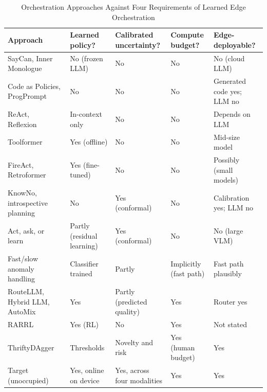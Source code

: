 \documentclass[journal]{IEEEtran}
\begin{document}
\begin{table}[!t]
\centering
\caption{Orchestration Approaches Against Four Requirements of Learned Edge Orchestration}\label{tab:orch}%
\footnotesize
\begin{tabular}{@{}>{\raggedright\arraybackslash}p{0.320\dimexpr\textwidth-10\tabcolsep\relax}>{\raggedright\arraybackslash}p{0.170\dimexpr\textwidth-10\tabcolsep\relax}>{\raggedright\arraybackslash}p{0.170\dimexpr\textwidth-10\tabcolsep\relax}>{\raggedright\arraybackslash}p{0.150\dimexpr\textwidth-10\tabcolsep\relax}>{\raggedright\arraybackslash}p{0.190\dimexpr\textwidth-10\tabcolsep\relax}@{}}
\toprule
\textbf{Approach} & \textbf{Learned policy?} & \textbf{Calibrated uncertainty?} & \textbf{Compute budget?} & \textbf{Edge-deployable?} \\ \midrule
SayCan, Inner Monologue~\cite{Ahn2022,Huang2022b} & No (frozen LLM) & No & No & No (cloud LLM) \\
Code as Policies, ProgPrompt~\cite{Liang2023,Singh2023} & No & No & No & Generated code yes; LLM no \\
ReAct, Reflexion~\cite{Yao2023a,Shinn2023} & In-context only & No & No & Depends on LLM \\
Toolformer~\cite{Schick2023} & Yes (offline) & No & No & Mid-size model \\
FireAct, Retroformer~\cite{Chen2023b,Yao2024} & Yes (fine-tuned) & No & No & Possibly (small models) \\
KnowNo, introspective planning~\cite{Ren2023,Liang2024} & No & Yes (conformal) & No & Calibration yes; LLM no \\
Act, ask, or learn~\cite{Yuan2026} & Partly (residual learning) & Yes (conformal) & No & No (large VLM) \\
Fast/slow anomaly handling~\cite{Sinha2024} & Classifier trained & Partly & Implicitly (fast path) & Fast path plausibly \\
RouteLLM, Hybrid LLM, AutoMix~\cite{Ong2025,Ding2024,Aggarwal2024} & Yes & Partly (predicted quality) & Yes & Router yes \\
RARRL~\cite{Liu2026} & Yes (RL) & No & Yes & Not stated \\
ThriftyDAgger~\cite{Hoque2021} & Thresholds & Novelty and risk & Yes (human budget) & Yes \\
Target (unoccupied) & Yes, online on device & Yes, across four modalities & Yes & Yes \\
\bottomrule
\end{tabular}
\end{table}
\end{document}
